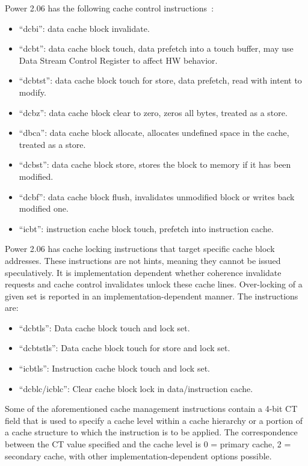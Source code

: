 Power 2.06 has the following cache control instructions~\cite{power2}:
\begin{itemize}
\item ``dcbi'': data cache block invalidate.
\item ``dcbt'': data cache block touch, data prefetch into a touch buffer, may use Data Stream Control Register to affect HW behavior.
\item ``dcbtst'': data cache block touch for store, data prefetch, read with intent to modify.
\item ``dcbz'': data cache block clear to zero, zeros all bytes, treated as a store.
\item ``dbca'': data cache block allocate, allocates undefined space in the cache, treated as a store. 
\item ``dcbst'': data cache block store, stores the block to memory if it has been modified.
\item ``dcbf'': data cache block flush, invalidates unmodified block or writes back modified one.
\item ``icbt'': instruction cache block touch, prefetch into instruction cache.
\end{itemize}

Power 2.06 has cache locking instructions that target specific cache block addresses.
These instructions are not hints, meaning they cannot be issued speculatively.
It is implementation dependent whether coherence invalidate requests and cache control invalidates unlock these cache lines.
Over-locking of a given set is reported in an implementation-dependent manner.
The instructions are:
\begin{itemize}
\item ``dcbtls'': Data cache block touch and lock set.
\item ``dcbtstls'': Data cache block touch for store and lock set.
\item ``icbtls'': Instruction cache block touch and lock set.
\item ``dcblc/icblc'': Clear cache block lock in data/instruction cache.
\end{itemize}

Some of the aforementioned cache management instructions contain a 4-bit CT field that is used to specify a cache level within a cache hierarchy or a portion of a cache structure to which the instruction is to be applied. The correspondence between the CT value specified and the cache level is 0 = primary cache, 2 = secondary cache, with other implementation-dependent  options possible.

